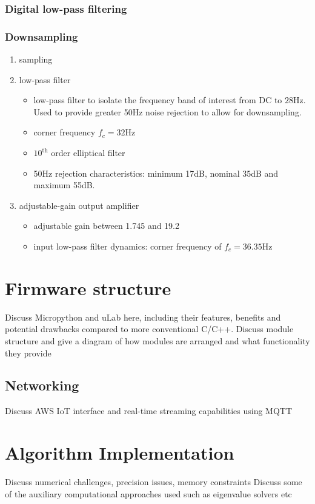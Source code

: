\subsubsection{Digital low-pass filtering}

\subsubsection{Downsampling}


\begin{enumerate}[label=(\alph*)] %
\item sampling
\begin{itemize}
   
\end{itemize}
\item low-pass filter
\begin{itemize}
    \item low-pass filter to isolate the frequency band of interest from DC to $28$Hz. Used to provide greater 50Hz noise rejection to allow for downsampling. 
    \item corner frequency $f_c=32$Hz
    \item $10^{\textrm{th}}$ order elliptical filter
    \item 50Hz rejection characteristics: minimum 17dB, nominal 35dB and maximum 55dB.
\end{itemize}

\item adjustable-gain output amplifier
\begin{itemize}
    \item adjustable gain between 1.745 and 19.2
    \item input low-pass filter dynamics: corner frequency of $f_c=36.35$Hz 
\end{itemize}
\end{enumerate}

\section{Firmware structure}
Discuss Micropython and uLab here, including their features, benefits and potential drawbacks compared to more conventional C/C++.
Discuss module structure and give a diagram of how modules are arranged and what functionality they provide

\subsection{Networking}
Discuss AWS IoT interface and real-time streaming capabilities using MQTT



\section{Algorithm Implementation}



Discuss numerical challenges, precision issues, memory constraints
Discuss some of the auxiliary computational approaches used such as eigenvalue solvers etc

